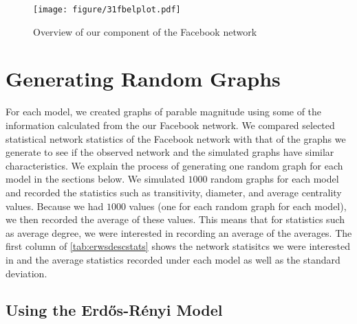 \documentclass[12pt,twoside]{amherstthesis}
\begin{document}
  \begin{Shaded}
  \begin{Highlighting}[]
  \NormalTok{(}\NormalTok{)}
  
  \StringTok{ }\NormalTok{(}\NormalTok{(}\NormalTok{), }
  
  \StringTok{ }
  \end{Highlighting}
  \end{Shaded}
  
  \begin{figure}[htbp]
  \centering
  \texttt{[image: figure/31fbelplot.pdf]}
  \caption{Overview of our component of the Facebook network}
  \end{figure}
  
  \section{Generating Random Graphs}\label{generating-random-graphs}
  
  For each model, we created graphs of parable magnitude using some of the
  information calculated from the our Facebook network. We compared
  selected statistical network statistics of the Facebook network with
  that of the graphs we generate to see if the observed network and the
  simulated graphs have similar characteristics. We explain the process of
  generating one random graph for each model in the sections below. We
  simulated \(1000\) random graphs for each model and recorded the
  statistics such as transitivity, diameter, and average centrality
  values. Because we had \(1000\) values (one for each random graph for
  each model), we then recorded the average of these values. This means
  that for statistics such as average degree, we were interested in
  recording an average of the averages. The first column of
  \autoref{tab:erwsdescstats} shows the network statisitcs we were
  interested in and the average statistics recorded under each model as
  well as the standard deviation.
  
  \subsection{Using the Erdős-Rényi
  Model}\label{using-the-erdos-renyi-model}
  
\end{document}
